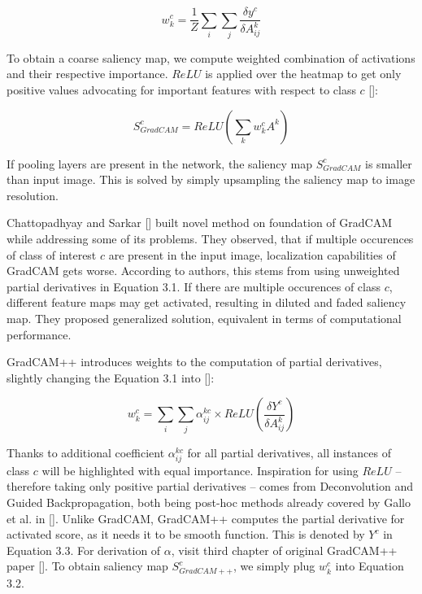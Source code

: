 \begin{equation}
    w^c_k = \frac{1}{Z} \sum_i \sum_j \frac{\delta y^c}{\delta A^k_{ij}}
\end{equation}

To obtain a coarse saliency map, we compute weighted combination of activations and their respective importance. $ReLU$ is applied over the heatmap to get only positive values advocating for important features with respect to class $c$ []:

\begin{equation}
    S^c_{GradCAM} = ReLU(\sum_k w^c_k A^k)
\end{equation}

If pooling layers are present in the network, the saliency map $S^c_{GradCAM}$ is smaller than input image. This is solved by simply upsampling the saliency map to image resolution.\newline


\noindent
Chattopadhyay and Sarkar [] built novel method on foundation of GradCAM while addressing some of its problems. They observed, that if multiple occurences of class of interest $c$ are present in the input image, localization capabilities of GradCAM gets worse. According to authors, this stems from using unweighted partial derivatives in Equation 3.1. If there are multiple occurences of class $c$, different feature maps may get activated, resulting in diluted and faded saliency map. They proposed generalized solution, equivalent in terms of computational performance.  


GradCAM++ introduces weights to the computation of partial derivatives, slightly changing the Equation 3.1 into []:

\begin{equation}
    w^c_k = \sum_i \sum_j \alpha^{kc}_{ij} \times ReLU(\frac{\delta Y^c}{\delta A^k_{ij}})
\end{equation}

Thanks to additional coefficient $\alpha^{kc}_{ij}$ for all partial derivatives, all instances of class $c$ will be highlighted with equal importance. Inspiration for using $ReLU$ -- therefore taking only positive partial derivatives -- comes from Deconvolution and Guided Backpropagation, both being post-hoc methods already covered by Gallo et al. in []. Unlike GradCAM, GradCAM++ computes the partial derivative for activated score, as it needs it to be smooth function. This is denoted by $Y^c$ in Equation 3.3. For derivation of $\alpha$, visit third chapter of original GradCAM++ paper []. To obtain saliency map $S^c_{GradCAM++}$, we simply plug $w^c_k$ into Equation 3.2.

